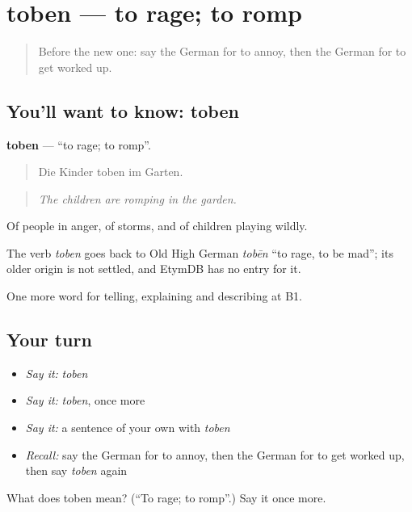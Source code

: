 \section[toben]{toben — to rage; to romp}

\label{lesson:GE-C468-toben}



\begin{quote}
Before the new one: say the German for to annoy, then the German for to get worked up.
\end{quote}

\subsection*{You'll want to know: toben}
\textbf{toben} — \textquotedblleft{}to rage; to romp\textquotedblright{}.

\begin{quote}
Die Kinder toben im Garten.
\end{quote}

\begin{quote}
\emph{The children are romping in the garden.}
\end{quote}

Of people in anger, of storms, and of children playing wildly.

\begin{cousinweb}
The verb \emph{toben} goes back to Old High German \emph{tobēn} \textquotedblleft{}to rage, to be mad\textquotedblright{}; its older origin is not settled, and EtymDB has no entry for it.
\end{cousinweb}

\begin{grammarlens}[title={What you've built}]
One more word for telling, explaining and describing at B1.
\end{grammarlens}

\subsection*{Your turn}
\begin{itemize}
\raggedright
  \item \emph{Say it:} \emph{toben}
  \item \emph{Say it:} \emph{toben}, once more
  \item \emph{Say it:} a sentence of your own with \emph{toben}
  \item \emph{Recall:} say the German for to annoy, then the German for to get worked up, then say \emph{toben} again
\end{itemize}

\begin{tcolorbox}[breakable,colback=teal!4,colframe=teal!35!black,title={Before you move on}]
What does toben mean? (\textquotedblleft{}To rage; to romp\textquotedblright{}.) Say it once more.
\end{tcolorbox}
